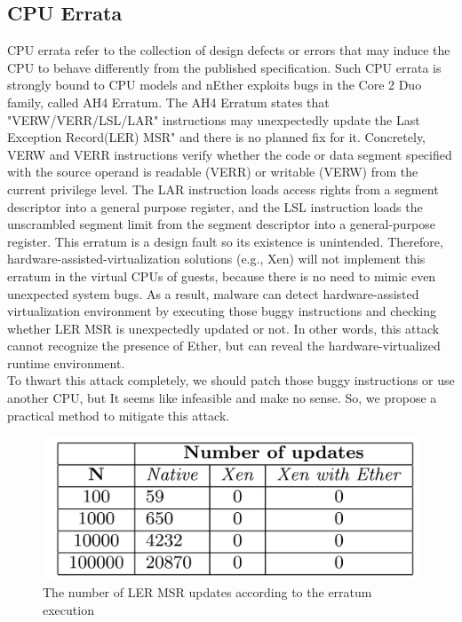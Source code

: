 \subsection{CPU Errata}
\label{sec:approach-errata}
CPU errata refer to the collection of design defects or errors that may induce the CPU to behave differently from the published specification. Such CPU errata is strongly bound to CPU models and nEther exploits bugs in the Core 2 Duo family, called AH4 Erratum. The AH4 Erratum states that "VERW/VERR/LSL/LAR" instructions may unexpectedly update the Last Exception Record(LER) MSR" and there is no planned fix for it. Concretely, VERW and VERR instructions verify whether the code or data segment specified with the source operand is readable (VERR) or writable (VERW) from the current privilege level. The LAR instruction loads access rights from a segment descriptor into a general purpose register, and the LSL instruction loads the unscrambled segment limit from the segment descriptor into a general-purpose register. This erratum is a design fault so its existence is unintended. Therefore, hardware-assisted-virtualization solutions (e.g., Xen) will not implement this erratum in the virtual CPUs of guests, because there is no need to mimic even unexpected system bugs. As a result, malware can detect hardware-assisted virtualization environment by executing those buggy instructions and checking whether LER MSR is unexpectedly updated or not. In other words, this attack cannot recognize the presence of Ether, but can reveal the hardware-virtualized runtime environment. \\

To thwart this attack completely, we should patch those buggy instructions or use another CPU, but It seems like infeasible and make no sense. So, we propose a practical method to mitigate this attack.

\begin{figure}[!h]
	\centering
	\includegraphics[width=\linewidth]{figure/errata_table.png}
	\caption{The number of LER MSR updates according to the erratum execution}
	\label{fig:errata}
\end{figure}

